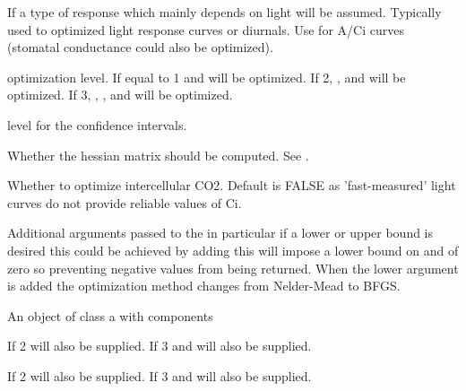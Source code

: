 \documentclass[letterpaper]{book}
\begin{document}
\begin{Arguments}
\begin{ldescription}
\item[\code{curve.kind}] If  a type of response which
mainly depends on light will be assumed. Typically used
to optimized light response curves or diurnals. Use
 for A/Ci curves (stomatal conductance could
also be optimized).

\item[\code{op.level}] optimization level. If equal to 1
 and  will be optimized. If 2,
,  and  will be
optimized. If 3, , , 
and  will be optimized.

\item[\code{level}] level for the confidence intervals.

\item[\code{hessian}] Whether the hessian matrix should be
computed. See .

\item[\code{op.ci}] Whether to optimize intercellular CO2.
Default is FALSE as 'fast-measured' light curves do not
provide reliable values of Ci.

\item[\code{list()}] Additional arguments passed to the
 in particular if a lower or upper
bound is desired this could be achieved by adding
 this will impose a lower bound on
 and  of zero so preventing
negative values from being returned. When the lower
argument is added the optimization method changes from
Nelder-Mead to BFGS.
\end{ldescription}
\end{Arguments}
%
\begin{Value}
An object of class  a 
with components

If  2  will also be supplied.
If  3  and  will
also be supplied.

If  2  will also be supplied.
If  3  and  will
also be supplied.
\end{Value}
%
\begin{SeeAlso}\relax
{} 
\end{SeeAlso}
%
\begin{Examples}
\end{Examples}
\end{document}
